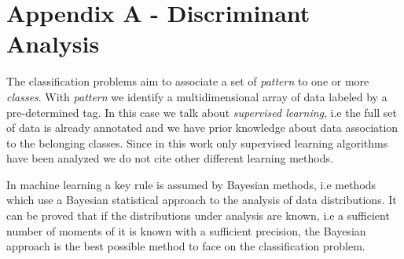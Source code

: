 \documentclass{standalone}
\begin{document}
\chapter*{Appendix A - Discriminant Analysis}

The classification problems aim to associate a set of \emph{pattern} to one or more \emph{classes}.
With \emph{pattern} we identify a multidimensional array of data labeled by a pre-determined tag.
In this case we talk about \emph{supervised learning}, i.e the full set of data is already annotated and we have prior knowledge about data association to the belonging classes.
Since in this work only supervised learning algorithms have been analyzed we do not cite other different learning methods.

In machine learning a key rule is assumed by Bayesian methods, i.e methods which use a Bayesian statistical approach to the analysis of data distributions.
It can be proved that if the distributions under analysis are known, i.e a sufficient number of moments of it is known with a sufficient precision, the Bayesian approach is the best possible method to face on the classification problem. %
\end{document}
